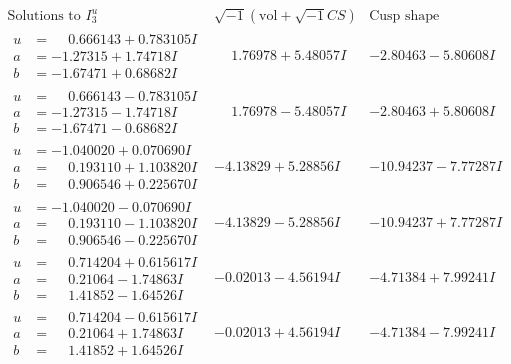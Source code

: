 \documentclass[1p]{elsarticle_modified}
\theoremstyle{definition}
\newcommand{\I}{\sqrt{-1}}
\begin{document}
$$\begin{array}{c|c|c}  
\text{Solutions to }I^u_{3}& \I (\text{vol} + \sqrt{-1}CS) & \text{Cusp shape}\\
 \hline 
\begin{aligned}
u &= \phantom{-}0.666143 + 0.783105 I \\
a &= -1.27315 + 1.74718 I \\
b &= -1.67471 + 0.68682 I\end{aligned}
 & \phantom{-}1.76978 + 5.48057 I & -2.80463 - 5.80608 I \\ \hline\begin{aligned}
u &= \phantom{-}0.666143 - 0.783105 I \\
a &= -1.27315 - 1.74718 I \\
b &= -1.67471 - 0.68682 I\end{aligned}
 & \phantom{-}1.76978 - 5.48057 I & -2.80463 + 5.80608 I \\ \hline\begin{aligned}
u &= -1.040020 + 0.070690 I \\
a &= \phantom{-}0.193110 + 1.103820 I \\
b &= \phantom{-}0.906546 + 0.225670 I\end{aligned}
 & -4.13829 + 5.28856 I & -10.94237 - 7.77287 I \\ \hline\begin{aligned}
u &= -1.040020 - 0.070690 I \\
a &= \phantom{-}0.193110 - 1.103820 I \\
b &= \phantom{-}0.906546 - 0.225670 I\end{aligned}
 & -4.13829 - 5.28856 I & -10.94237 + 7.77287 I \\ \hline\begin{aligned}
u &= \phantom{-}0.714204 + 0.615617 I \\
a &= \phantom{-}0.21064 - 1.74863 I \\
b &= \phantom{-}1.41852 - 1.64526 I\end{aligned}
 & -0.02013 - 4.56194 I & -4.71384 + 7.99241 I \\ \hline\begin{aligned}
u &= \phantom{-}0.714204 - 0.615617 I \\
a &= \phantom{-}0.21064 + 1.74863 I \\
b &= \phantom{-}1.41852 + 1.64526 I\end{aligned}
 & -0.02013 + 4.56194 I & -4.71384 - 7.99241 I \\ \hline\begin{aligned}

\end{aligned}
\end{array}$$
\end{document}
